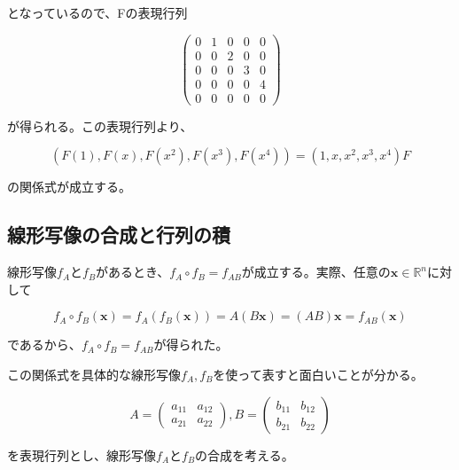 \documentclass[dvipdfmx,autodetect-engine]{jsarticle}
\theoremstyle{definition}
\newcommand{\vecSpace}[1]{\mathbb{R}^{#1}}
\begin{document}
となっているので、Fの表現行列

$$
\begin{pmatrix}
0 & 1 & 0 & 0 & 0 \\
0 & 0 & 2 & 0 & 0 \\
0 & 0 & 0 & 3 & 0 \\
0 & 0 & 0 & 0 & 4 \\
0 & 0 & 0 & 0 & 0
\end{pmatrix}
$$

が得られる。この表現行列より、

$$
(F(1), F(x), F(x^2), F(x^3), F(x^4)) = (1, x, x^2, x^3, x^4)F
$$

の関係式が成立する。


\subsection{線形写像の合成と行列の積}

線形写像$f_A$と$f_B$があるとき、$f_A \circ f_B = f_{AB}$が成立する。実際、任意の$\bm{x} \in \vecSpace{n}$に対して

$$
f_A \circ f_B(\bm{x}) = f_A(f_B(\bm{x})) = A(B\bm{x}) = (AB)\bm{x} = f_{AB}(\bm{x})
$$

であるから、$f_A \circ f_B = f_{AB}$が得られた。

この関係式を具体的な線形写像$f_A, f_B$を使って表すと面白いことが分かる。

$$
A = \begin{pmatrix}
a_{11} & a_{12} \\
a_{21} & a_{22}
\end{pmatrix}, 
B = \begin{pmatrix}
b_{11} & b_{12} \\
b_{21} & b_{22}
\end{pmatrix}
$$

を表現行列とし、線形写像$f_A$と$f_B$の合成を考える。
\end{document}
